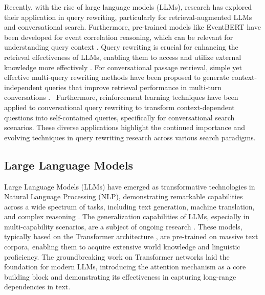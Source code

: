 Recently, with the rise of large language models (LLMs), research has explored their application in query rewriting, particularly for retrieval-augmented LLMs and conversational search.  Furthermore, pre-trained models like EventBERT have been developed for event correlation reasoning, which can be relevant for understanding query context \cite{zhou2022eventbert}. Query rewriting is crucial for enhancing the retrieval effectiveness of LLMs, enabling them to access and utilize external knowledge more effectively \cite{QRforLLM2023, QRinLLMOpenReview}.  For conversational passage retrieval, simple yet effective multi-query rewriting methods have been proposed to generate context-independent queries that improve retrieval performance in multi-turn conversations \cite{SimpleMultiQR2024}.  Furthermore, reinforcement learning techniques have been applied to conversational query rewriting to transform context-dependent questions into self-contained queries, specifically for conversational search scenarios. These diverse applications highlight the continued importance and evolving techniques in query rewriting research across various search paradigms.

\subsection{Large Language Models}

Large Language Models (LLMs) have emerged as transformative technologies in Natural Language Processing (NLP), demonstrating remarkable capabilities across a wide spectrum of tasks, including text generation, machine translation, and complex reasoning \cite{LLMSurvey2024}.  The generalization capabilities of LLMs, especially in multi-capability scenarios, are a subject of ongoing research \cite{zhou2025weak}. These models, typically based on the Transformer architecture \cite{AttentionIsAllYouNeed2017}, are pre-trained on massive text corpora, enabling them to acquire extensive world knowledge and linguistic proficiency.  The groundbreaking work on Transformer networks \cite{AttentionIsAllYouNeed2017} laid the foundation for modern LLMs, introducing the attention mechanism as a core building block and demonstrating its effectiveness in capturing long-range dependencies in text.

